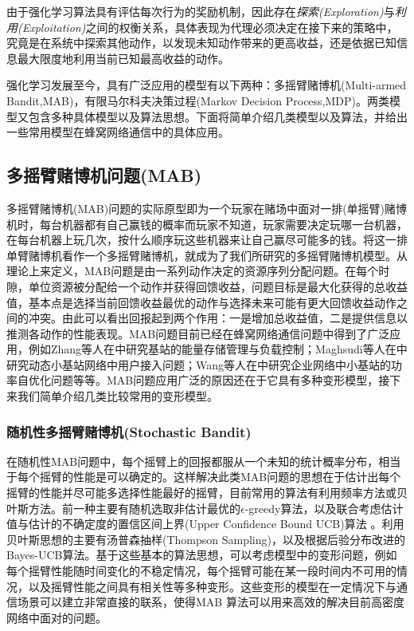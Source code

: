 \documentclass{IEEEtran}
\begin{document}
由于强化学习算法具有评估每次行为的奖励机制，因此存在\emph{探索(Exploration)}与\emph{利用(Exploitation)}之间的权衡关系，具体表现为代理必须决定在接下来的策略中，究竟是在系统中探索其他动作，以发现未知动作带来的更高收益，还是依据已知信息最大限度地利用当前已知最高收益的动作。

强化学习发展至今，具有广泛应用的模型有以下两种：多摇臂赌博机(Multi-armed Bandit,MAB)，有限马尔科夫决策过程(Markov Decision Process,MDP)。两类模型又包含多种具体模型以及算法思想。下面将简单介绍几类模型以及算法，并给出一些常用模型在蜂窝网络通信中的具体应用。


\subsection{多摇臂赌博机问题(MAB)}
多摇臂赌博机(MAB)问题的实际原型即为一个玩家在赌场中面对一排(单摇臂)赌博机时，每台机器都有自己赢钱的概率而玩家不知道，玩家需要决定玩哪一台机器，在每台机器上玩几次，按什么顺序玩这些机器来让自己赢尽可能多的钱。将这一排单臂赌博机看作一个多摇臂赌博机，就成为了我们所研究的多摇臂赌博机模型。从理论上来定义，MAB问题是由一系列动作决定的资源序列分配问题。在每个时隙，单位资源被分配给一个动作并获得回馈收益，问题目标是最大化获得的总收益值，基本点是选择当前回馈收益最优的动作与选择未来可能有更大回馈收益动作之间的冲突。由此可以看出回报起到两个作用：一是增加总收益值，二是提供信息以推测各动作的性能表现。MAB问题目前已经在蜂窝网络通信问题中得到了广泛应用，例如Zhang等人在\cite{Zhang2017}中研究基站的能量存储管理与负载控制；Maghsudi等人在\cite{Maghsudi2017}中研究动态小基站网络中用户接入问题；Wang等人在\cite{Wang2017}中研究企业网络中小基站的功率自优化问题等等。MAB问题应用广泛的原因还在于它具有多种变形模型，接下来我们简单介绍几类比较常用的变形模型。
\subsubsection{随机性多摇臂赌博机(Stochastic Bandit)}
在随机性MAB问题中，每个摇臂上的回报都服从一个未知的统计概率分布，相当于每个摇臂的性能是可以确定的。这样解决此类MAB问题的思想在于估计出每个摇臂的性能并尽可能多选择性能最好的摇臂，目前常用的算法有利用频率方法或贝叶斯方法。前一种主要有随机选取非估计最优的$\epsilon$-greedy算法\cite{Sutton2016}，以及联合考虑估计值与估计的不确定度的置信区间上界(Upper Confidence Bound UCB)算法       \cite{Auer2002a}。利用贝叶斯思想的主要有汤普森抽样(Thompson Sampling)\cite{Agrawal2012}\cite{Kaufmann2012}，以及根据后验分布改进的Bayes-UCB算法\cite{Kaufmann2012a}。基于这些基本的算法思想，可以考虑模型中的变形问题，例如每个摇臂性能随时间变化的不稳定情况，每个摇臂可能在某一段时间内不可用的情况，以及摇臂性能之间具有相关性等多种变形。这些变形的模型在一定情况下与通信场景可以建立非常直接的联系，使得MAB 算法可以用来高效的解决目前高密度网络中面对的问题。
\end{document}
